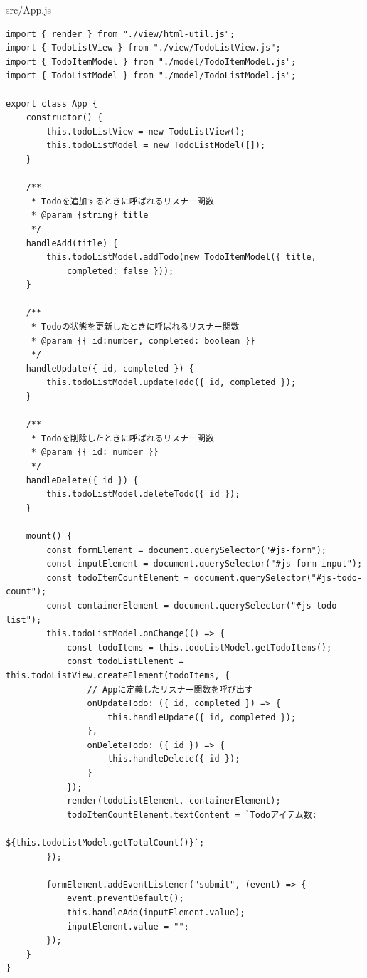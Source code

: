 \begin{listtitle}
src/App.js
\end{listtitle}
\begin{lstlisting}
import { render } from "./view/html-util.js";
import { TodoListView } from "./view/TodoListView.js";
import { TodoItemModel } from "./model/TodoItemModel.js";
import { TodoListModel } from "./model/TodoListModel.js";

export class App {
    constructor() {
        this.todoListView = new TodoListView();
        this.todoListModel = new TodoListModel([]);
    }

    /**
     * Todoを追加するときに呼ばれるリスナー関数
     * @param {string} title
     */
    handleAdd(title) {
        this.todoListModel.addTodo(new TodoItemModel({ title, 
            completed: false }));
    }

    /**
     * Todoの状態を更新したときに呼ばれるリスナー関数
     * @param {{ id:number, completed: boolean }}
     */
    handleUpdate({ id, completed }) {
        this.todoListModel.updateTodo({ id, completed });
    }

    /**
     * Todoを削除したときに呼ばれるリスナー関数
     * @param {{ id: number }}
     */
    handleDelete({ id }) {
        this.todoListModel.deleteTodo({ id });
    }

    mount() {
        const formElement = document.querySelector("#js-form");
        const inputElement = document.querySelector("#js-form-input");
        const todoItemCountElement = document.querySelector("#js-todo-count");
        const containerElement = document.querySelector("#js-todo-list");
        this.todoListModel.onChange(() => {
            const todoItems = this.todoListModel.getTodoItems();
            const todoListElement = this.todoListView.createElement(todoItems, {
                // Appに定義したリスナー関数を呼び出す
                onUpdateTodo: ({ id, completed }) => {
                    this.handleUpdate({ id, completed });
                },
                onDeleteTodo: ({ id }) => {
                    this.handleDelete({ id });
                }
            });
            render(todoListElement, containerElement);
            todoItemCountElement.textContent = `Todoアイテム数: 
                                     ${this.todoListModel.getTotalCount()}`;
        });

        formElement.addEventListener("submit", (event) => {
            event.preventDefault();
            this.handleAdd(inputElement.value);
            inputElement.value = "";
        });
    }
}
\end{lstlisting}
\listend

